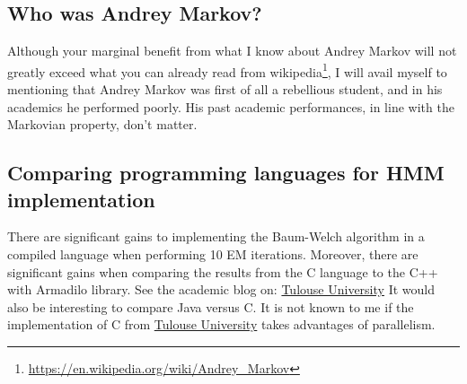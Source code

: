 \documentclass[a4paper,12pt]{article}
\theoremstyle{definition}
\begin{document}
\subsection{Who was Andrey Markov?}  Although your marginal benefit from what I know about Andrey Markov will not greatly exceed what you can already read from wikipedia\footnote{\href{https://en.wikipedia.org/wiki/Andrey\_Markov}{https://en.wikipedia.org/wiki/Andrey\_Markov}}, I will avail myself to mentioning that Andrey Markov was first of all a rebellious student, and in his academics he performed poorly. His past academic performances, in line with the Markovian property, don't matter.  

\subsection{Comparing programming languages for HMM implementation}
There are significant gains to implementing the Baum-Welch algorithm in a compiled language when performing 10 EM iterations. Moreover, there are significant gains when comparing the results from the C language to the C++ with Armadilo library. See the academic blog on: \href{http://www.math.univ-toulouse.fr/~agarivie/Telecom/code/index.php}{Tulouse University} 
It would also be interesting to compare Java versus C. It is not known to me if the implementation of C from \href{http://www.math.univ-toulouse.fr/~agarivie/Telecom/code/index.php}{Tulouse University} takes advantages of parallelism. 

\newpage

\end{document}
